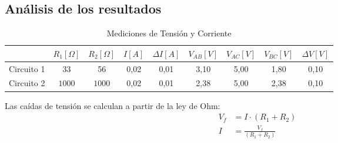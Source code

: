 \documentclass[12pt]{article}
\begin{document}
\subsection{Análisis de los resultados}
\begin{table}[h!]
  \begin{center}
    \label{tab:Tensión y corriente 2}  %
    \begin{tabular}{|c|c|c|c|c|c|c|c|c|} %
      \hline
      & $R_{1} [\Omega]$ & $R_{2} [\Omega]$ & $I [A]$ & $\Delta I [A]$ & $V_{AB} [V]$ & $V_{AC} [V]$ & $V_{BC} [V]$ & $\Delta V [V]$ \\ %
      \hline
      Circuito 1 & 33 & 56 & 0,02 & 0,01 & 3,10 & 5,00 & 1,80 & 0,10 \\  
    \hline
      Circuito 2 & $1000$ & $1000$ & 0,02 & 0,01 & 2,38 & 5,00 & 2,38 & 0,10 \\ 
          \hline
      \end{tabular}
    \caption{Mediciones de Tensión y Corriente}
  \end{center}
\end{table}

Las caídas de tensión se calculan a partir de la ley de Ohm:
\begin{align}
    V_{f} & = I \cdot (R_{1}+R_{2}) \\
    I & = \frac{V_{f}}{(R_{1}+R_{2})}
\end{align}
\end{document}
